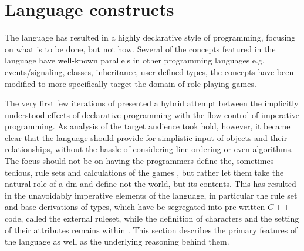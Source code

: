 \section{Language constructs}
The \langname{} language has resulted in a highly declarative style of programming, focusing on what is to be done, but not how. Several of the concepts featured in the language have well-known parallels in other programming languages e.g. events/signaling, classes, inheritance, user-defined types, the concepts have been modified to more specifically target the domain of role-playing games.

The very first few iterations of \langname{} presented a hybrid attempt between the implicitly understood effects of declarative programming with the flow control of imperative programming. As analysis of the target audience took hold, however, it became clear that the language should provide for simplistic input of objects and their relationships, without the hassle of considering line ordering or even algorithms. The focus should not be on having the programmers define the, sometimes tedious, rule sets and calculations of the games \cite{wod}, but rather let them take the natural role of a \ac{dm} and define not the world, but its contents. This has resulted in the unavoidably imperative elements of the language, in particular the rule set and base derivations of types, which have be segregated into pre-written $C++$ code, called the external ruleset, while the definition of characters and the setting of their attributes remains within \langname{}. This section describes the primary features of the \langname{} language as well as the underlying reasoning behind them.
